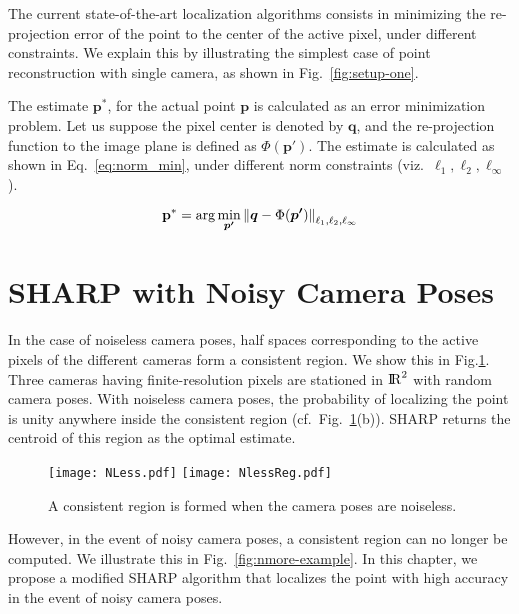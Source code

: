 The current state-of-the-art localization algorithms consists in minimizing the re-projection error of the point to the center of the active pixel, under different constraints. We explain this by illustrating the simplest case of point reconstruction with single camera, as shown in Fig.~\ref{fig:setup-one}.

The estimate $\mathbf{p}^{*}$, for the actual point $\mathbf{p}$ is calculated as an error minimization problem. Let us suppose the pixel center is denoted by $\mathbf{q}$, and the re-projection function to the image plane is defined as ${\Phi}(\boldsymbol{p'})$. The estimate is calculated as shown in Eq.~\ref{eq:norm_min}, under different norm constraints (viz.\ $\ell_1, \ell_2, \ell_\infty$).

\begin{equation}
\centering
		\mathbf{p}^{*} = \arg \min_{\boldsymbol{p'}} \left\|\boldsymbol{q} - {\Phi}(\boldsymbol{p'})\right\|_{\ell_1, \ell_2, \ell_\infty}
\label{eq:norm_min}		
\end{equation}

\section{SHARP with Noisy Camera Poses}
\label{sec:chap8-noisySHARP}
In the case of noiseless camera poses, half spaces corresponding to the active pixels of the different cameras form a consistent region. We show this in Fig.\ref{fig:nless-example}. Three cameras having finite-resolution pixels are stationed in ${\rm I\!R}^{2}$ with random camera poses. With noiseless camera poses, the probability of localizing the point is unity anywhere inside the consistent region (cf.\ Fig.~\ref{fig:nless-example}(b)). SHARP returns the centroid of this region as the optimal estimate.

\begin{figure}[htb]
\centering
\texttt{[image: NLess.pdf]} 
\hspace{1mm}
\texttt{[image: NlessReg.pdf]}\\
\caption[Illustration of a consistent region when the camera poses are noiseless.]{A consistent region is formed when the camera poses are noiseless.}
\label{fig:nless-example}
\end{figure}

However, in the event of noisy camera poses, a consistent region can no longer be computed. We illustrate this in Fig.~\ref{fig:nmore-example}. In this chapter, we propose a modified SHARP algorithm that localizes the point with high accuracy in the event of noisy camera poses. 

